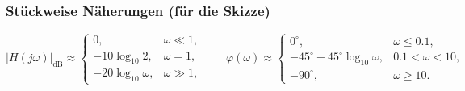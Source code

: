 \subsubsection*{Stückweise Näherungen (für die Skizze)}
\[
|H(j\omega)|_{\mathrm{dB}}\approx
\begin{cases}
0,& \omega\ll 1,\\[2pt]
-10\log_{10}2,& \omega=1,\\[2pt]
-20\log_{10}\omega,& \omega\gg 1,
\end{cases}
\qquad
\varphi(\omega)\approx
\begin{cases}
0^\circ,& \omega\le 0.1,\\[2pt]
-45^\circ-45^\circ\log_{10}\omega,& 0.1<\omega<10,\\[2pt]
-90^\circ,& \omega\ge 10.
\end{cases}
\]

\newpage 
